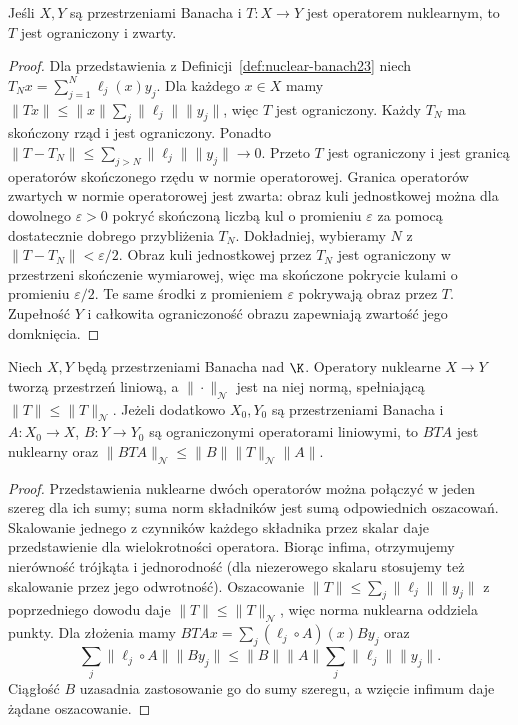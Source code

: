 \begin{twierdzenie}
\label{thm:nuclear-compact23}
Jeśli $X,Y$ są przestrzeniami Banacha i $T:X\to Y$
jest operatorem nuklearnym, to $T$ jest ograniczony i zwarty.
\end{twierdzenie}
\begin{proof}
Dla przedstawienia z Definicji~\ref{def:nuclear-banach23}
niech $T_Nx=\sum_{j=1}^N\ell_j(x)y_j$.
Dla każdego $x\in X$ mamy
$\|Tx\|\le\|x\|\sum_j\|\ell_j\|\|y_j\|$,
więc $T$ jest ograniczony. Każdy $T_N$ ma skończony
rząd i jest ograniczony. Ponadto
$\|T-T_N\|\le\sum_{j>N}\|\ell_j\|\|y_j\|\to0$.
Przeto $T$ jest ograniczony i jest granicą operatorów
skończonego rzędu w normie operatorowej. Granica
operatorów zwartych w normie operatorowej jest zwarta:
obraz kuli jednostkowej można dla dowolnego $\varepsilon>0$
pokryć skończoną liczbą kul o promieniu $\varepsilon$
za pomocą dostatecznie dobrego przybliżenia $T_N$.
Dokładniej, wybieramy $N$ z $\|T-T_N\|<\varepsilon/2$.
Obraz kuli jednostkowej przez $T_N$ jest ograniczony
w przestrzeni skończenie wymiarowej, więc ma skończone
pokrycie kulami o promieniu $\varepsilon/2$.
Te same środki z promieniem $\varepsilon$ pokrywają
obraz przez $T$. Zupełność $Y$ i całkowita ograniczoność
obrazu zapewniają zwartość jego domknięcia.
\end{proof}

\begin{stwierdzenie}
\label{prop:nuclear-ideal23}
Niech $X,Y$ będą przestrzeniami Banacha nad $\K$.
Operatory nuklearne $X\to Y$ tworzą przestrzeń liniową,
a $\|\cdot\|_{\mathcal N}$ jest na niej normą,
spełniającą $\|T\|\le\|T\|_{\mathcal N}$.
Jeżeli dodatkowo $X_0,Y_0$ są przestrzeniami Banacha
i $A:X_0\to X$, $B:Y\to Y_0$ są ograniczonymi
operatorami liniowymi, to $BTA$ jest nuklearny oraz
$\|BTA\|_{\mathcal N}\le\|B\|\|T\|_{\mathcal N}\|A\|$.
\end{stwierdzenie}
\begin{proof}
Przedstawienia nuklearne dwóch operatorów można połączyć
w jeden szereg dla ich sumy; suma norm składników jest
sumą odpowiednich oszacowań. Skalowanie jednego z czynników
każdego składnika przez skalar daje przedstawienie
dla wielokrotności operatora. Biorąc infima, otrzymujemy
nierówność trójkąta i jednorodność (dla niezerowego
skalaru stosujemy też skalowanie przez jego odwrotność).
Oszacowanie $\|T\|\le\sum_j\|\ell_j\|\|y_j\|$
z poprzedniego dowodu daje $\|T\|\le\|T\|_{\mathcal N}$,
więc norma nuklearna oddziela punkty.
Dla złożenia mamy
$BTAx=\sum_j(\ell_j\circ A)(x)By_j$ oraz
\[
 \sum_j\|\ell_j\circ A\|\|By_j\|
 \le\|B\|\|A\|\sum_j\|\ell_j\|\|y_j\|.
\]
Ciągłość $B$ uzasadnia zastosowanie go do sumy szeregu,
a wzięcie infimum daje żądane oszacowanie.
\end{proof}

